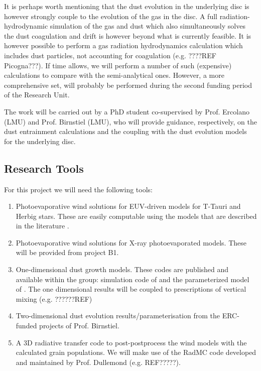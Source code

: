 \documentclass[10pt,fleqn,twoside]{article}
\begin{document}
It is perhaps worth mentioning that the dust evolution in the
underlying disc is however strongly couple to the evolution of the gas
in the disc. A full radiation-hydrodynamic simulation of the gas and
dust which also simultaneously solves the dust coagulation and drift
is however beyond what is currently feasible. It is however possible
to perform a gas radiation hydrodynamics calculation which includes
dust particles, not accounting for coagulation (e.g. ????REF
Picogna???). If time allows, we will perform a number of such
(expensive) calculations to compare with the semi-analytical
ones. However, a more comprehensive set, will probably be performed
during the second funding period of the Research Unit. 


The work will be carried out by a PhD student co-supervised by
Prof. Ercolano (LMU) and Prof. Birnstiel (LMU), who will provide
guidance, respectively, on the dust entrainment calculations and the
coupling with the dust evolution models for the underlying disc. 

\subsection{Research Tools}

For this project we will need the following tools:
\begin{enumerate}
\item Photoevaporative wind solutions for EUV-driven
models for T-Tauri and Herbig stars. These are easily computable 
using the models that are described in the literature \citep[e.g.,][]{2004ApJ...607..890F}.
\item Photoevaporative wind solutions for X-ray photoevaporated
models. These will be provided from project B1.
\item One-dimensional dust growth models. These codes are published
and available within the group: simulation code of 
 \citet{2010A&A...513A..79B} and the parameterized model of
 \citet{2012A&A...539A.148B}. The one dimensional results will be
 coupled to prescriptions of vertical mixing (e.g. ??????REF)
\item Two-dimensional dust evolution results/parameterisation from the
  ERC-funded projects of Prof. Birnstiel.
\item A 3D radiative transfer code to post-postprocess the wind
models with the calculated grain populations. We will make use  of the
RadMC code developed and maintained by Prof. Dullemond (e.g. REF?????).
\end{enumerate}
\end{document}
